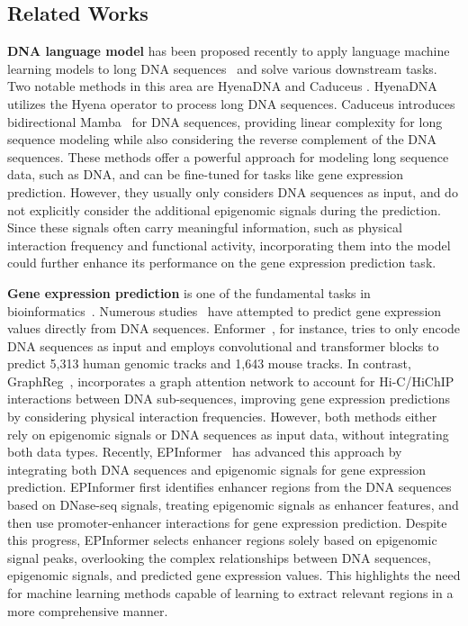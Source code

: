 \subsection{Related Works}
\noindent\textbf{DNA language model} has been proposed recently to apply language machine learning models to long DNA sequences~\citep{hyenaDNA,gu2023mamba,caduceus} and solve various downstream tasks.
Two notable methods in this area are HyenaDNA \citep{hyenaDNA} and Caduceus \citep{caduceus}. 
HyenaDNA utilizes the Hyena operator \citep{hyena_op} to process long DNA sequences.
Caduceus introduces bidirectional Mamba~\citep{gu2023mamba} for DNA sequences, providing linear complexity for long sequence modeling while also considering the reverse complement of the DNA sequences. 
These methods offer a powerful approach for modeling long sequence data, such as DNA, and can be fine-tuned for tasks like gene expression prediction. However, they usually only considers DNA sequences as input, and do not explicitly consider the additional epigenomic signals during the prediction. 
Since these signals often carry meaningful information, such as physical interaction frequency and functional activity, incorporating them into the model could further enhance its performance on the gene expression prediction task.

\noindent\textbf{Gene expression prediction} is one of the fundamental tasks in bioinformatics~\citep{segal2002promoter}. 
Numerous studies~\citep{Xpresso,graphreg,enformer,epinformer} have attempted to predict gene expression values directly from DNA sequences. 
Enformer~\citep{enformer}, for instance, tries to only encode DNA sequences as input and employs convolutional and transformer blocks to predict 5,313 human genomic  tracks and 1,643 mouse tracks. 
In contrast, GraphReg~\citep{graphreg}, incorporates a graph attention network to account for Hi-C/HiChIP interactions between DNA sub-sequences, improving gene expression predictions by considering physical interaction frequencies.
However, both methods either rely on epigenomic  signals or DNA sequences as input data, without integrating both data types.  
Recently, EPInformer~\citep{epinformer} has advanced this approach by integrating both DNA sequences and epigenomic signals for gene expression prediction. EPInformer first identifies enhancer regions from the DNA sequences based on DNase-seq signals, treating epigenomic signals as enhancer features, and then use promoter-enhancer interactions for gene expression prediction. 
Despite this progress, EPInformer selects enhancer regions solely based on epigenomic signal peaks, overlooking the complex relationships between DNA sequences, epigenomic signals, and predicted gene expression values. This highlights the need for machine learning methods capable of learning to extract relevant regions in a more comprehensive manner.

